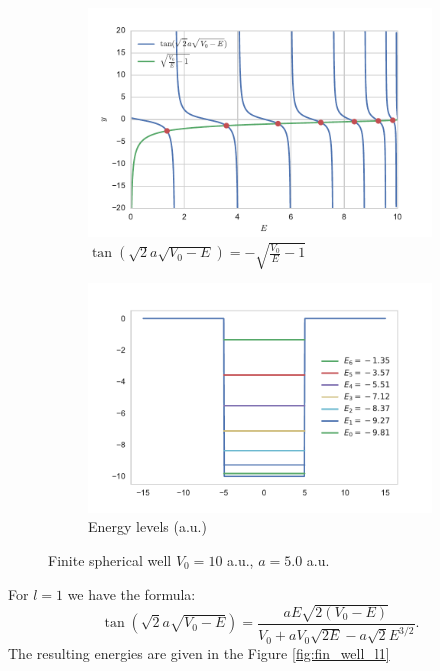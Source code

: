 \documentclass[a4paper, 11pt]{article}
\begin{document}
\begin{figure}[h!]
\centering
\begin{subfigure}{.5\textwidth}
  \centering
  \includegraphics[width=1.0\linewidth]{tan-sqrt.pdf}
  \caption{$\tan(\sqrt{2} a \sqrt{V_0-E})=-\sqrt{\frac{V_0}{E}-1}$}
  \label{fig1:tan-sqrt}
\end{subfigure}%
\begin{subfigure}{.5\textwidth}
  \centering
  \includegraphics[width=1.0\linewidth]{ens_finite.pdf}
  \caption{Energy levels (a.u.)}
  \label{fig:finite_well_sol}
\end{subfigure}
\caption{Finite spherical well $V_0 = 10$ a.u., $a=5.0$ a.u.}
\label{fig:fin_well}
\end{figure}
For $l=1$ we have the formula:
$$\tan(\sqrt{2} a \sqrt{V_0-E}) = \frac{a E \sqrt{2(V_0 - E)}}{V_0+a V_0 \sqrt{2E} -a \sqrt{2} E^{3/2}}.$$
The resulting energies are given in the Figure \ref{fig:fin_well_l1}
\end{document}
